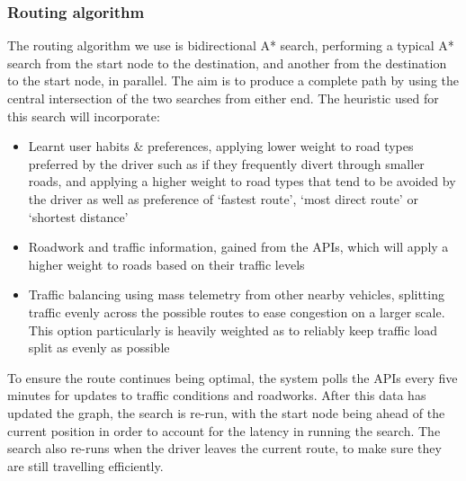 \documentclass{article}
\begin{document}
\subsubsection{Routing algorithm}\label{sssec:nav-tech-routing}
The routing algorithm we use is bidirectional A* search, performing a typical A* search from the start node to the destination, and another from the destination to the start node, in parallel. The aim is to produce a complete path by using the central intersection of the two searches from either end. The heuristic used for this search will incorporate:
\begin{itemize}
	\item Learnt user habits \& preferences, applying lower weight to road types preferred by the driver such as if they frequently divert through smaller roads, and applying a higher weight to road types that tend to be avoided by the driver as well as preference of `fastest route', `most direct route' or `shortest distance'
	\item Roadwork and traffic information, gained from the APIs, which will apply a higher weight to roads based on their traffic levels
	\item Traffic balancing using mass telemetry from other nearby vehicles, splitting traffic evenly across the possible routes to ease congestion on a larger scale. This option particularly is heavily weighted as to reliably keep traffic load split as evenly as possible
\end{itemize}
To ensure the route continues being optimal, the system polls the APIs every five minutes for updates to traffic conditions and roadworks. After this data has updated the graph, the search is re-run, with the start node being ahead of the current position in order to account for the latency in running the search. The search also re-runs when the driver leaves the current route, to make sure they are still travelling efficiently.
\end{document}
